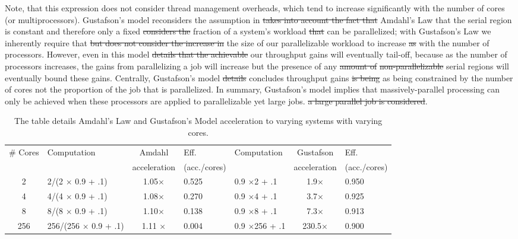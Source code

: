 \documentclass[10pt]{article}[draft]
\begin{document}
Note, that this expression does not consider thread management overheads, which tend to  increase significantly with the number of cores (or multiprocessors). Gustafson's model reconsiders the assumption in \st{takes into account the fact that} Amdahl's Law that the serial region is constant and therefore only a fixed \st{considers the} fraction of a system's workload \st{that} can be parallelized; with Gustafson's Law we inherently require that \st{but does not consider the increase in} the size of our parallelizable workload to increase \st{as} with the number of processors. However, even in this model \st{details  that the achievable} our throughput gains will eventually tail-off, because as the number of processors increases, the gains from parallelizing a job will increase but the presence of any \st{amount of} \st{non-parallelizable} serial regions will eventually bound these gains. Centrally, Gustafson's model \st{details} concludes throughput gains \st{is being} as being constrained by the number of cores not the proportion of the job that is parallelized.  In summary, Gustafson's model implies that massively-parallel processing can only be achieved when these processors are applied  to parallelizable yet large jobs. \st{a large parallel job is considered}. 

\begin{table}
	\begin{tabular}{|c|l|c|l|l|c|l|}
		\hline
		\# Cores & Computation  & Amdahl  &  Eff. &Computation & Gustafson  & Eff.   \\
			 &   &  acceleration &    (acc./cores)   &  &  acceleration& (acc./cores)  \\
		\hline
		2&2/(2 $\times$ 0.9 + .1) & 1.05$\times$ & 0.525 & 0.9 $\times$2 + .1 &  1.9$\times$& 0.950\\
		\hline
4&4/(4 $\times$ 0.9 + .1)& 1.08$\times$ & 0.270 & 0.9 $\times$4 + .1 &  3.7$\times$&0.925\\
		\hline
	8&8/(8 $\times$ 0.9 + .1) & 1.10$\times$ & 0.138 & 0.9 $\times$8 + .1 &  7.3$\times$&0.913\\
		\hline
		256&256/(256 $\times$ 0.9 + .1) &  1.11 $\times$ &0.004 & 0.9 $\times$256 + .1 &  230.5$\times$&0.900\\
		\hline
	\end{tabular}
\caption{The table details Amdahl's Law and Gustafson's Model acceleration to varying systems with varying cores.}
\end{table}
\end{document}
